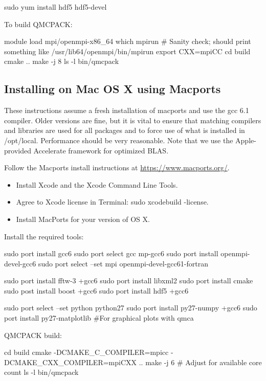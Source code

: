 \begin{shade}
sudo yum install hdf5 hdf5-devel
\end{shade}

To build QMCPACK:

\begin{shade}
module load mpi/openmpi-x86_64
which mpirun
# Sanity check; should print something like   /usr/lib64/openmpi/bin/mpirun
export CXX=mpiCC
cd build
cmake ..
make -j 8
ls -l bin/qmcpack
\end{shade}

\subsection{Installing on Mac OS X using Macports}
These instructions assume a fresh installation of macports
and use the gcc 6.1 compiler. Older versions are fine, but it is vital to ensure that 
matching compilers and libraries are used for all
packages and to force use of what is installed in /opt/local.  Performance should be very reasonable.
Note that we use the Apple-provided Accelerate framework for
optimized BLAS.

Follow the Macports install instructions at \url{https://www.macports.org/}.

\begin{itemize}
\item Install Xcode and the Xcode Command Line Tools.
\item Agree to Xcode license in Terminal: sudo xcodebuild -license.
\item Install MacPorts for your version of OS X.
\end{itemize}

Install the required tools:

\begin{shade}
sudo port install gcc6
sudo port select gcc mp-gcc6
sudo port install openmpi-devel-gcc6
sudo port select --set mpi openmpi-devel-gcc61-fortran

sudo port install fftw-3 +gcc6
sudo port install libxml2
sudo port install cmake
sudo post install boost +gcc6
sudo port install hdf5 +gcc6

sudo port select --set python python27
sudo port install py27-numpy +gcc6
sudo port install py27-matplotlib  #For graphical plots with qmca
\end{shade}

QMCPACK build:

\begin{shade}
cd build
cmake -DCMAKE_C_COMPILER=mpicc -DCMAKE_CXX_COMPILER=mpiCXX ..
make -j 6 # Adjust for available core count
ls -l bin/qmcpack
\end{shade}


